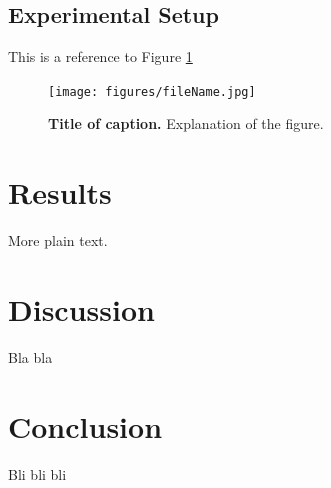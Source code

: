 \documentclass[]{article}
\begin{document}
\subsection{Experimental Setup}
This is a reference to Figure \ref{figureLabel}

\begin{figure}[ht]
\begin{center}
\vspace{-3mm}
\texttt{[image: figures/fileName.jpg]}
\end{center}
\caption{\textbf{Title of caption.} Explanation of the figure.}
\label{figureLabel}
\end{figure}


\section{Results}
More plain text.

\section{Discussion}
Bla bla

\section{Conclusion}
Bli bli bli



\end{document}
